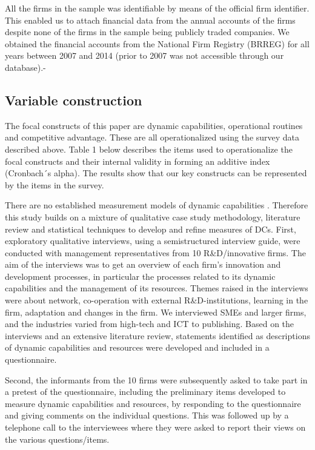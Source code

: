 \documentclass[review,fleqn]{elsarticle}\usepackage[]{graphicx}\usepackage[]{color}
\begin{document}
All the firms in the sample was identifiable by means of the official firm
identifier. This enabled us to attach financial data from the annual accounts of the firms
despite none of the firms in the sample being publicly traded companies. We obtained the
financial accounts from the National Firm Registry (BRREG) for all years between 2007 and
2014 (prior to 2007 was not accessible through our database).-

\subsection{Variable construction}

The focal constructs of this paper are dynamic capabilities, operational routines and
competitive advantage. These are all operationalized using the survey data described
above. Table 1 below describes the items used to operationalize the focal constructs and
their internal validity in forming an additive index (Cronbach´s alpha). The results show
that our key constructs can be represented by the items in the survey.


There are no established measurement models of dynamic capabilities
\citep{McKelvie2009,Schilke2018}. Therefore this study builds on a mixture of qualitative
case study methodology, literature review and statistical techniques to develop and refine
measures of DCs. First, exploratory qualitative interviews, using a semistructured
interview guide, were conducted with management representatives from 10 R\&D/innovative
firms. The aim of the interviews was to get an overview of each firm's innovation and
development processes, in particular the processes related to its dynamic capabilities and
the management of its resources. Themes raised in the interviews were about network,
co-operation with external R\&D-institutions, learning in the firm, adaptation and changes
in the firm. We interviewed SMEs and larger firms, and the industries varied from
high-tech and ICT to publishing.  Based on the interviews and an extensive literature
review, statements identified as descriptions of dynamic capabilities and resources were
developed and included in a questionnaire.

Second, the informants from the 10 firms were subsequently asked to take part in a pretest
of the questionnaire, including the preliminary items developed to measure dynamic
capabilities and resources, by responding to the questionnaire and giving comments on the
individual questions. This was followed up by a telephone call to the interviewees where
they were asked to report their views on the various questions/items.
\end{document}

